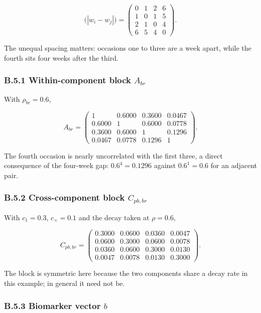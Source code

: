 \documentclass[
  11pt,
]{article}
\begin{document}
\[
\bigl(|w_i - w_j|\bigr) =
\begin{pmatrix}
0 & 1 & 2 & 6\\
1 & 0 & 1 & 5\\
2 & 1 & 0 & 4\\
6 & 5 & 4 & 0
\end{pmatrix}.
\]

The unequal spacing matters: occasions one to three are a week apart,
while the fourth sits four weeks after the third.

\subsubsection{B.5.1 Within-component block $A_{br}$}

With \(\rho_{br} = 0.6\),

\[
A_{br} =
\begin{pmatrix}
1 & 0.6000 & 0.3600 & 0.0467\\
0.6000 & 1 & 0.6000 & 0.0778\\
0.3600 & 0.6000 & 1 & 0.1296\\
0.0467 & 0.0778 & 0.1296 & 1
\end{pmatrix}.
\]

The fourth occasion is nearly uncorrelated with the first three, a
direct consequence of the four-week gap: \(0.6^{4} = 0.1296\) against
\(0.6^{1} = 0.6\) for an adjacent pair.

\subsubsection{B.5.2 Cross-component block $C_{pb,br}$}

With \(c_1 = 0.3\), \(c_{\times} = 0.1\) and the decay taken at
\(\rho = 0.6\),

\[
C_{pb,br} =
\begin{pmatrix}
0.3000 & 0.0600 & 0.0360 & 0.0047\\
0.0600 & 0.3000 & 0.0600 & 0.0078\\
0.0360 & 0.0600 & 0.3000 & 0.0130\\
0.0047 & 0.0078 & 0.0130 & 0.3000
\end{pmatrix}.
\]

The block is symmetric here because the two components share a decay
rate in this example; in general it need not be.

\subsubsection{B.5.3 Biomarker vector $b$}
\end{document}
